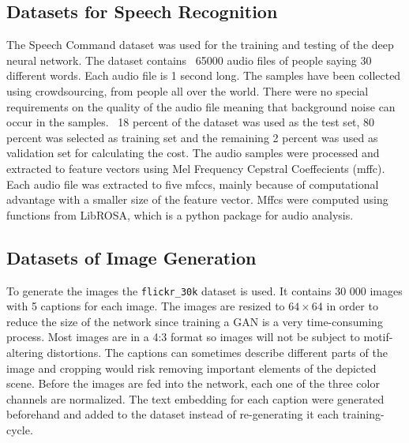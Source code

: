 \documentclass[../main.tex]{subfiles}
\begin{document}
\subsection{Datasets for Speech Recognition}
The Speech Command \cite{speechcommandsv2} dataset was used for the training and testing of the deep neural network. The dataset contains ~65000 audio files of people saying 30 different words. Each audio file is 1 second long. The samples have been collected using crowdsourcing, from people all over the world. There were no special requirements on the quality of the audio file meaning that background noise can occur in the samples. ~18 percent of the dataset was used as the test set, 80 percent was selected as training set and the remaining 2 percent was used as validation set for calculating the cost.  The audio samples were processed and extracted to feature vectors using Mel Frequency Cepstral Coeffecients (mffc). Each audio file was extracted to five mfccs, mainly because of computational advantage with a smaller size of the feature vector. Mffcs were computed using functions from LibROSA, which is a python package for audio analysis. \cite{mcfee2015librosa}

\subsection{Datasets of Image Generation}
To generate the images the \texttt{flickr\_30k} dataset is used. It contains 30 000 images with 5 captions for each image. The images are resized to $64 \times 64$ in order to reduce the size of the network since training a GAN is a very time-consuming process. Most images are in a 4:3 format so images will not be subject to motif-altering distortions. The captions can sometimes describe different parts of the image and cropping would risk removing important elements of the depicted scene.
Before the images are fed into the network, each one of the three color channels are normalized. The text embedding for each caption were generated beforehand and added to the dataset instead of re-generating it each training-cycle.
\end{document}
